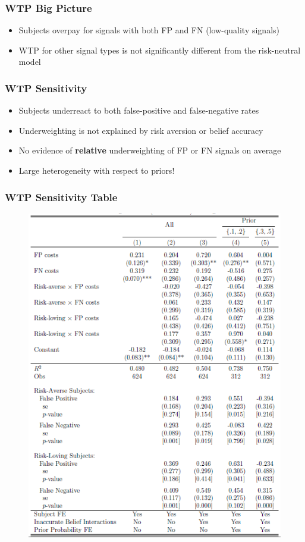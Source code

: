 \documentclass[11pt,hyperref={bookmarks=false}]{beamer}
\begin{document}
\begin{frame}
\frametitle{WTP Big Picture}
\begin{itemize}
\item Subjects overpay for signals with both FP and FN (low-quality signals)
\item WTP for other signal types is not significantly different from the risk-neutral model
\end{itemize}

\small

\end{frame}




\begin{frame}
\frametitle{WTP Sensitivity}
\begin{itemize}
\item Subjects underreact to both false-positive and false-negative rates
\item Underweighting is not explained by risk aversion or belief accuracy
\item No evidence of \textbf{relative} underweighting of FP or FN signals on average
\item Large heterogeneity with respect to priors!
\end{itemize}
\end{frame}


\begin{frame}
\frametitle{WTP Sensitivity Table}
\begin{figure}[h]
\includegraphics[scale=0.55]{table_WTP_OLS.png}
\end{figure}

\end{frame}
\end{document}
